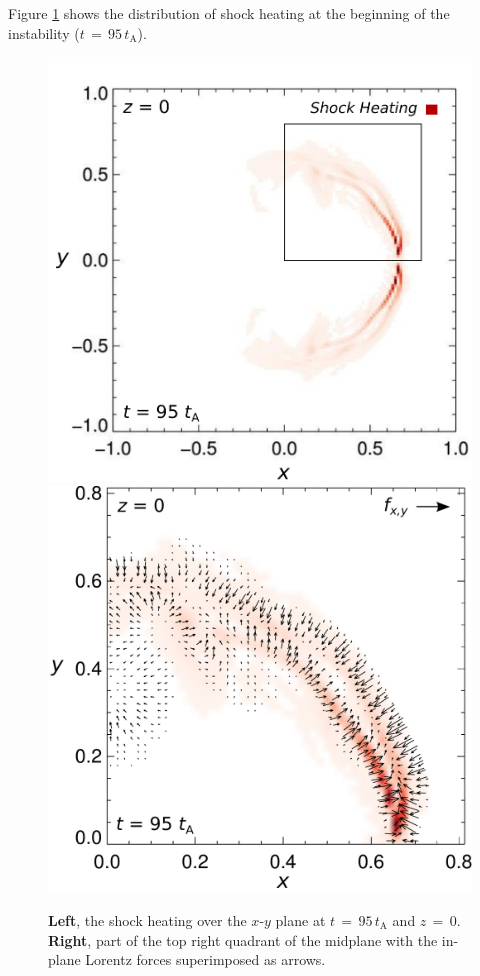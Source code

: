 \documentclass{./packages/rs/rsproca}
\begin{document}
Figure \ref{xy_visc_map} shows the distribution of shock heating at the beginning of the instability ($t\,{=}\,95\,t_{\mathrm{A}}$).
\begin{figure}[h!]
  \center  
  \includegraphics[scale=0.415]{./inkscape/256x256x512/xy_visc_sca}
  \includegraphics[scale=0.35]{./inkscape/256x256x512/visc_sca_rf_vec}
  \caption{\small{\textbf{Left}, the shock heating over the $x$-$y$ plane at $t\,{=}\,95\,t_{\mathrm{A}}$ and $z\,{=}\,0$. \textbf{Right}, part of the top right quadrant of the midplane with the in-plane Lorentz forces superimposed as arrows.}}
  \label{xy_visc_map}
  \vspace{-10pt}
\end{figure}
\end{document}
